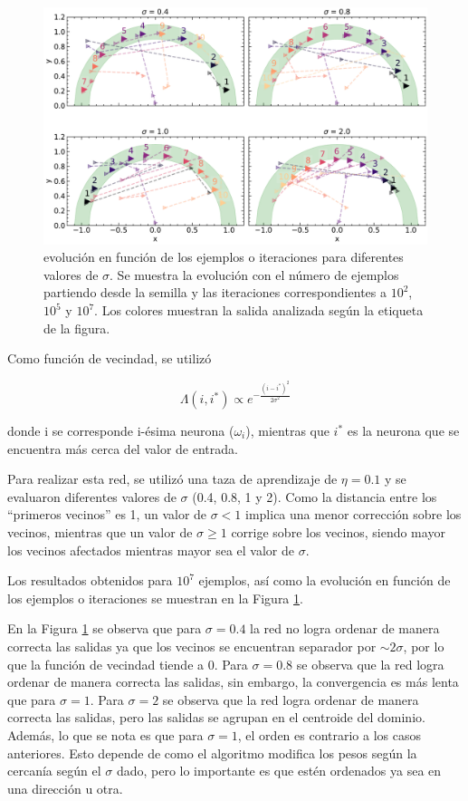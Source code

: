 \documentclass[11pt, twocolumn]{article}
\begin{document}
\begin{figure} [t]
    \centering
    \includegraphics[width=\textwidth]{figures/ej_2_trainings.pdf}
    \caption{evolución en función de los ejemplos o iteraciones para diferentes valores de \(\sigma\). Se muestra la evolución con el número de ejemplos partiendo desde la semilla y las iteraciones correspondientes a \(10^2\), \(10^5\) y \(10^7\). Los colores muestran la salida analizada según la etiqueta de la figura.}
    \label{fig:ej2_pesos}

\end{figure}

Como función de vecindad, se utilizó 

\begin{equation} \nonumber
    \Lambda(i, i^*) \propto  e^{-\frac{(i-i^*)^2}{2 \sigma^2}}
\end{equation}

\noindent donde i se corresponde i-ésima neurona (\(\omega_i\)), mientras que \(i^*\) es la neurona que se encuentra más cerca del valor de entrada.

Para realizar esta red, se utilizó una taza de aprendizaje de \(\eta = 0.1\) y se evaluaron diferentes valores de \(\sigma\) (0.4, 0.8, 1 y 2). Como la distancia entre los ``primeros vecinos'' es 1, un valor de \(\sigma < 1\) implica una menor corrección sobre los vecinos, mientras que un valor de \(\sigma \geq  1\) corrige sobre los vecinos, siendo mayor los vecinos afectados mientras mayor sea el valor de \(\sigma\).

Los resultados obtenidos para \(10^7\) ejemplos, así como la evolución en función de los ejemplos o iteraciones se muestran en la Figura \ref{fig:ej2_pesos}.

En la Figura \ref{fig:ej2_pesos} se observa que para \(\sigma = 0.4\) la red no logra ordenar de manera correcta las salidas ya que los vecinos se encuentran separador por \(\sim 2\sigma\), por lo que la función de vecindad tiende a 0. Para \(\sigma = 0.8\) se observa que la red logra ordenar de manera correcta las salidas, sin embargo, la convergencia es más lenta que para \(\sigma = 1\). Para \(\sigma = 2\) se observa que la red logra ordenar de manera correcta las salidas, pero las salidas se agrupan en el centroide del dominio. Además, lo que se nota es que para \(\sigma = 1\), el orden es contrario a los casos anteriores. Esto depende de como el algoritmo modifica los pesos según la cercanía según el \(\sigma\) dado, pero lo importante es que estén ordenados ya sea en una dirección u otra.
\end{document}

